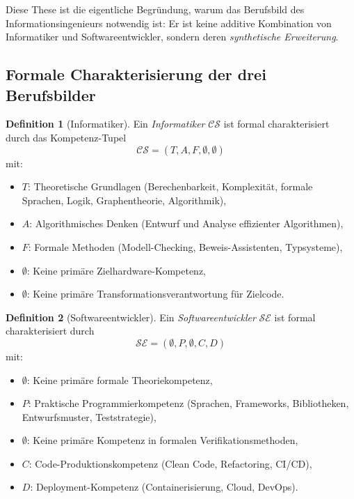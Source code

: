 ﻿\documentclass[a4paper,12pt]{article}
\theoremstyle{definition}
\newtheorem{definition}{Definition}
\begin{document}
Diese These ist die eigentliche Begründung, warum das Berufsbild des
Informationsingenieurs notwendig ist: Er ist keine additive Kombination von
Informatiker und Softwareentwickler, sondern deren \emph{synthetische Erweiterung}.

\subsection{Formale Charakterisierung der drei Berufsbilder}

\begin{definition}[Informatiker]
\label{def:informatiker}
Ein \emph{Informatiker} $\mathcal{CS}$ ist formal charakterisiert durch das Kompetenz-Tupel
\[
  \mathcal{CS} = (T, A, F, \emptyset, \emptyset)
\]
mit:
\begin{itemize}
  \item $T$: Theoretische Grundlagen (Berechenbarkeit, Komplexität, formale Sprachen,
        Logik, Graphentheorie, Algorithmik),
  \item $A$: Algorithmisches Denken (Entwurf und Analyse effizienter Algorithmen),
  \item $F$: Formale Methoden (Modell-Checking, Beweis-Assistenten, Typsysteme),
  \item $\emptyset$: Keine primäre Zielhardware-Kompetenz,
  \item $\emptyset$: Keine primäre Transformationsverantwortung für Zielcode.
\end{itemize}
\end{definition}

\begin{definition}[Softwareentwickler]
\label{def:swentw}
Ein \emph{Softwareentwickler} $\mathcal{SE}$ ist formal charakterisiert durch
\[
  \mathcal{SE} = (\emptyset, P, \emptyset, C, D)
\]
mit:
\begin{itemize}
  \item $\emptyset$: Keine primäre formale Theoriekompetenz,
  \item $P$: Praktische Programmierkompetenz (Sprachen, Frameworks, Bibliotheken,
        Entwurfsmuster, Teststrategie),
  \item $\emptyset$: Keine primäre Kompetenz in formalen Verifikationsmethoden,
  \item $C$: Code-Produktionskompetenz (Clean Code, Refactoring, CI/CD),
  \item $D$: Deployment-Kompetenz (Containerisierung, Cloud, DevOps).
\end{itemize}
\end{definition}
\end{document}
